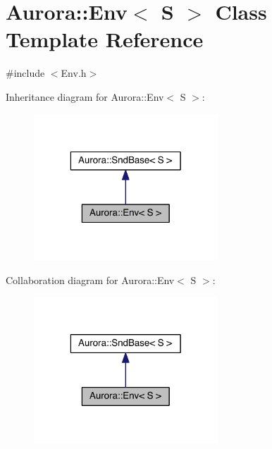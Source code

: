 \hypertarget{class_aurora_1_1_env}{}\section{Aurora\+:\+:Env$<$ S $>$ Class Template Reference}
\label{class_aurora_1_1_env}


{\ttfamily \#include $<$Env.\+h$>$}



Inheritance diagram for Aurora\+:\+:Env$<$ S $>$\+:\nopagebreak
\begin{figure}[H]
\begin{center}
\leavevmode
\includegraphics[width=196pt]{class_aurora_1_1_env__inherit__graph}
\end{center}
\end{figure}


Collaboration diagram for Aurora\+:\+:Env$<$ S $>$\+:\nopagebreak
\begin{figure}[H]
\begin{center}
\leavevmode
\includegraphics[width=196pt]{class_aurora_1_1_env__coll__graph}
\end{center}
\end{figure}
